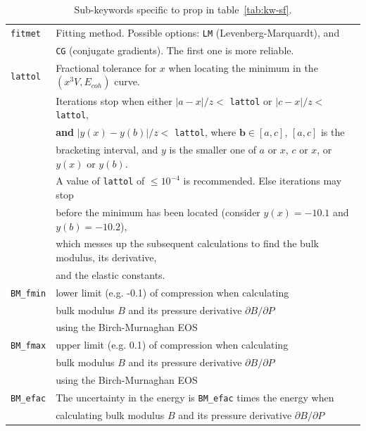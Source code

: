 \documentclass[a4paper,12pt,onecolumn]{article}
\def\b{\mathbf{b}}
\begin{document}
\begin{table}[!h]
\caption{
Sub-keywords specific to \textrm{prop} in table~\ref{tab:kw-sf}.
\label{tab:kw-sf-par-prop}
}
\begin{center}
\begin{tabular}{|l|l|}
\hline
\hline
\verb+fitmet+      & Fitting method. Possible options: \verb+LM+ (Levenberg-Marquardt), and \\
                   & \verb+CG+ (conjugate gradients). The first one is more reliable. \\
\verb+lattol+      & Fractional tolerance for $x$ when locating the minimum in the $(x^3 V, E_{coh})$ curve. \\
                   & Iterations stop when either $|a-x|/z <$ \verb+lattol+ or $|c-x|/z <$ \verb+lattol+, \\
                   & \textbf{and} $|y(x)-y(b)|/z <$ \verb+lattol+, where $\b \in [a, c]$, $[a, c]$ is the \\
                   & bracketing interval, and $y$ is the smaller one of $a$ or $x$, $c$ or $x$, or $y(x)$ or $y(b)$. \\
                   & A value of \verb+lattol+ of $\leq 10^{-4}$ is recommended. Else iterations may stop \\
                   & before the minimum has been located (consider $y(x) = -10.1$ and $y(b) = -10.2$), \\
                   & which messes up the subsequent calculations to find the bulk modulus, its derivative, \\
                   & and the elastic constants. \\
\verb+BM_fmin+     & lower limit (e.g. -0.1) of compression when calculating \\
                     & bulk modulus $B$ and its pressure derivative $\partial B/\partial P$ \\
                     & using the Birch-Murnaghan EOS \\
\verb+BM_fmax+     & upper limit (e.g.  0.1) of compression when calculating \\
                     & bulk modulus $B$ and its pressure derivative $\partial B/\partial P$ \\
                     & using the Birch-Murnaghan EOS \\
\verb+BM_efac+     & The uncertainty in the energy is \verb+BM_efac+ times the energy when \\
                     & calculating bulk modulus $B$ and its pressure derivative $\partial B/\partial P$ \\

\end{tabular}
\end{center}
\end{table}
\end{document}
